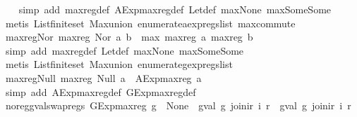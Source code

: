 \begin{isabellebody}
%
\isadelimproof
\ \ %
\endisadelimproof
%
\isatagproof
{}\isamarkupfalse%
\ {\isacharparenleft}simp\ add{\isacharcolon}\ max{\isacharunderscore}reg{\isacharunderscore}def\ AExp{\isachardot}max{\isacharunderscore}reg{\isacharunderscore}def\ Let{\isacharunderscore}def\ max{\isacharunderscore}None\ max{\isacharunderscore}Some{\isacharunderscore}Some{\isacharparenright}\isanewline
\ \ \isamarkupfalse%
\ {\isacharparenleft}metis\ List{\isachardot}finite{\isacharunderscore}set\ Max{\isachardot}union\ enumerate{\isacharunderscore}aexp{\isacharunderscore}regs{\isacharunderscore}list\ max{\isachardot}commute{\isacharparenright}%
\endisatagproof
{\isafoldproof}%
%
\isadelimproof
\isanewline
%
\endisadelimproof
\isanewline
{}\isamarkupfalse%
\ max{\isacharunderscore}reg{\isacharunderscore}Nor{\isacharcolon}\ {\isachardoublequoteopen}max{\isacharunderscore}reg\ {\isacharparenleft}Nor\ a\ b{\isacharparenright}\ {\isacharequal}\ max\ {\isacharparenleft}max{\isacharunderscore}reg\ a{\isacharparenright}\ {\isacharparenleft}max{\isacharunderscore}reg\ b{\isacharparenright}{\isachardoublequoteclose}\isanewline
%
\isadelimproof
\ \ %
\endisadelimproof
%
\isatagproof
{}\isamarkupfalse%
\ {\isacharparenleft}simp\ add{\isacharcolon}\ max{\isacharunderscore}reg{\isacharunderscore}def\ Let{\isacharunderscore}def\ max{\isacharunderscore}None\ max{\isacharunderscore}Some{\isacharunderscore}Some{\isacharparenright}\isanewline
\ \ \isamarkupfalse%
\ {\isacharparenleft}metis\ List{\isachardot}finite{\isacharunderscore}set\ Max{\isachardot}union\ enumerate{\isacharunderscore}gexp{\isacharunderscore}regs{\isacharunderscore}list{\isacharparenright}%
\endisatagproof
{\isafoldproof}%
%
\isadelimproof
\isanewline
%
\endisadelimproof
\isanewline
{}\isamarkupfalse%
\ max{\isacharunderscore}reg{\isacharunderscore}Null{\isacharcolon}\ {\isachardoublequoteopen}max{\isacharunderscore}reg\ {\isacharparenleft}Null\ a{\isacharparenright}\ {\isacharequal}\ AExp{\isachardot}max{\isacharunderscore}reg\ a{\isachardoublequoteclose}\isanewline
%
\isadelimproof
\ \ %
\endisadelimproof
%
\isatagproof
{}\isamarkupfalse%
\ {\isacharparenleft}simp\ add{\isacharcolon}\ AExp{\isachardot}max{\isacharunderscore}reg{\isacharunderscore}def\ GExp{\isachardot}max{\isacharunderscore}reg{\isacharunderscore}def{\isacharparenright}%
\endisatagproof
{\isafoldproof}%
%
\isadelimproof
\isanewline
%
\endisadelimproof
\isanewline
{}\isamarkupfalse%
\ no{\isacharunderscore}reg{\isacharunderscore}gval{\isacharunderscore}swap{\isacharunderscore}regs{\isacharcolon}\ {\isachardoublequoteopen}GExp{\isachardot}max{\isacharunderscore}reg\ g\ {\isacharequal}\ None\ {\isasymLongrightarrow}\ gval\ g\ {\isacharparenleft}join{\isacharunderscore}ir\ i\ r{\isacharparenright}\ {\isacharequal}\ gval\ g\ {\isacharparenleft}join{\isacharunderscore}ir\ i\ r{\isacharprime}{\isacharparenright}{\isachardoublequoteclose}\isanewline

\end{isabellebody}
